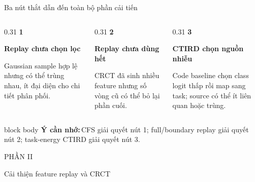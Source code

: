 \documentclass[aspectratio=169,10pt]{beamer}
\newcommand{\remember}[1]{%
  \par\vspace{0.12cm}%
  \begin{beamercolorbox}[wd=\linewidth,sep=0.11cm,leftskip=0.08cm,rightskip=0.08cm,rounded=true]{block body}
    \footnotesize\textbf{\color{HRMBlue}Ý cần nhớ:}\,\color{HRMDark}#1
  \end{beamercolorbox}
}
\newcommand{\sectionframe}[2]{%
  \begin{frame}[plain]
    \vfill
    {\large\color{HRMBlue}#1}\par\vspace{0.35cm}
    {\Huge\color{HRMDark}#2}\par
    \vfill
  \end{frame}
}
\begin{document}
\begin{frame}{Ba nút thắt dẫn đến toàn bộ phần cải tiến}
  \begin{columns}[T,onlytextwidth]
    \begin{column}{0.31\textwidth}
      {\Large\bfseries\color{HRMBlue}1}\par
      \textbf{Replay chưa chọn lọc}\par\vspace{0.25cm}
      Gaussian sample hợp lệ nhưng có thể trùng nhau, ít đại diện cho chi tiết phân phối.
    \end{column}
    \begin{column}{0.31\textwidth}
      {\Large\bfseries\color{HRMBlue}2}\par
      \textbf{Replay chưa dùng hết}\par\vspace{0.25cm}
      CRCT đã sinh nhiều feature nhưng số vòng cũ có thể bỏ lại phần cuối.
    \end{column}
    \begin{column}{0.31\textwidth}
      {\Large\bfseries\color{HRMBlue}3}\par
      \textbf{CTIRD chọn nguồn nhiễu}\par\vspace{0.25cm}
      Code baseline chọn class logit thấp rồi map sang task; source có thể ít liên quan hoặc trùng.
    \end{column}
  \end{columns}
  \remember{CFS giải quyết nút 1; full/boundary replay giải quyết nút 2; task-energy CTIRD giải quyết nút 3.}
\end{frame}

\sectionframe{PHẦN II}{Cải thiện feature replay và CRCT}
\end{document}
